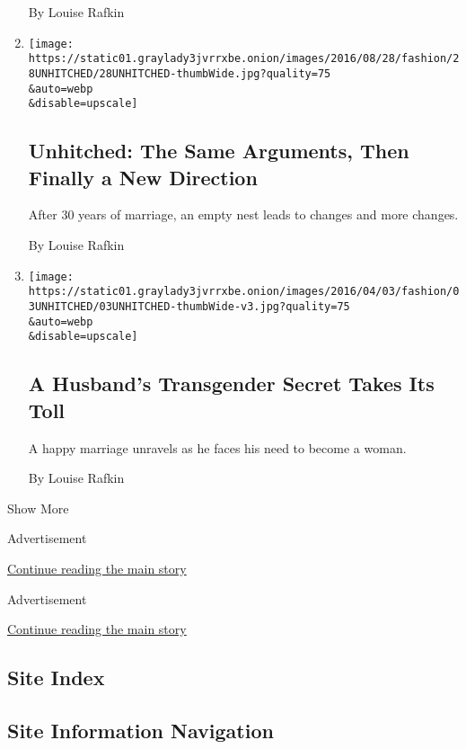 \begin{enumerate}
  By Louise Rafkin
\item
  \href{/2016/08/28/fashion/weddings/unhitched-arguments-separation-divorce.html}{}

  \texttt{[image: https://static01.graylady3jvrrxbe.onion/images/2016/08/28/fashion/28UNHITCHED/28UNHITCHED-thumbWide.jpg?quality=75\\\&auto=webp\\\&disable=upscale]}

  \hypertarget{unhitched-the-same-arguments-then-finally-a-new-direction}{%
  \subsection{Unhitched: The Same Arguments, Then Finally a New
  Direction}\label{unhitched-the-same-arguments-then-finally-a-new-direction}}

  After 30 years of marriage, an empty nest leads to changes and more
  changes.

  By Louise Rafkin
\item
  \href{/2016/04/03/fashion/weddings/a-husbands-secret-takes-its-toll.html}{}

  \texttt{[image: https://static01.graylady3jvrrxbe.onion/images/2016/04/03/fashion/03UNHITCHED/03UNHITCHED-thumbWide-v3.jpg?quality=75\\\&auto=webp\\\&disable=upscale]}

  \hypertarget{a-husbands-transgender-secret-takes-its-toll}{%
  \subsection{A Husband's Transgender Secret Takes Its
  Toll}\label{a-husbands-transgender-secret-takes-its-toll}}

  A happy marriage unravels as he faces his need to become a woman.

  By Louise Rafkin
\end{enumerate}

Show More

Advertisement

\protect\hyperlink{after-mid1}{Continue reading the main story}

Advertisement

\protect\hyperlink{after-mktg}{Continue reading the main story}

\hypertarget{site-index}{%
\subsection{Site Index}\label{site-index}}

\hypertarget{site-information-navigation}{%
\subsection{Site Information
Navigation}\label{site-information-navigation}}

